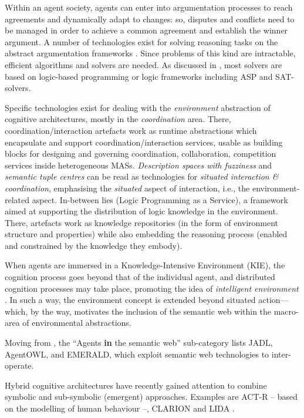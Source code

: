 \documentclass[12pt,a4paper,openright,twoside]{book}
\begin{document}
Within an agent society, agents can enter into argumentation processes to reach agreements and dynamically adapt to changes: so, disputes and conflicts need to be managed in order to achieve a common agreement and establish the winner argument.
%
A number of technologies exist for solving reasoning tasks on the abstract argumentation frameworks \cite{Dung:1995:AAF:220193.220197}.
%
Since problems of this kind are intractable, efficient algorithms and solvers are needed.
%
As discussed in \cite{Gaggl_Linsbichler_Maratea_Woltran_2018}, most solvers are based on logic-based programming or logic frameworks including ASP and SAT-solvers.

Specific technologies exist for dealing with the \emph{environment} abstraction of cognitive architectures, mostly in the \emph{coordination} area.
%
There, coordination/interaction artefacts work as runtime abstractions which encapsulate and support coordination/interaction services, usable as building blocks for designing and governing coordination, collaboration,  competition services inside heterogeneous MASs.
%
\emph{Description spaces with fuzziness} \cite{DBLP:conf/sac/NardiniOV11} and \emph{semantic tuple centres} \cite{DBLP:conf/sac/NardiniVP10} can be read as technologies for \emph{situated interaction \& coordination}, emphasising the \emph{situated} aspect of interaction, i.e., the environment-related aspect.
%
In-between lies \lpaas{} (Logic Programming as a Service), a framework aimed at supporting the distribution of logic knowledge in the environment.
%
There, artefacts work as knowledge repositories (in the form of environment structure and properties) while also embedding the reasoning process (enabled and constrained by the knowledge they embody).

When agents are immersed in a Knowledge-Intensive Environment (KIE), the cognition process goes beyond that of the individual agent, and distributed cognition processes may take place, promoting the idea of \emph{intelligent environment} \cite{distributedcognition-hollan-2000}.
%
In such a way, the environment concept is extended beyond situated action---which, by the way, motivates the inclusion of the semantic web within the macro-area of environmental abstractions.

Moving from \cite{Hendler2001}, the ``Agents {\bf in} the semantic web'' sub-category lists JADL, AgentOWL, and EMERALD, which exploit semantic web technologies to inter-operate.

Hybrid cognitive architectures have recently gained attention to combine symbolic and sub-symbolic (emergent) approaches.
%
Examples are ACT-R \cite{Anderson2003} -- based on the modelling of human behaviour --, CLARION \cite{Sun2005} and LIDA \cite{franklin2006}.
\end{document}
